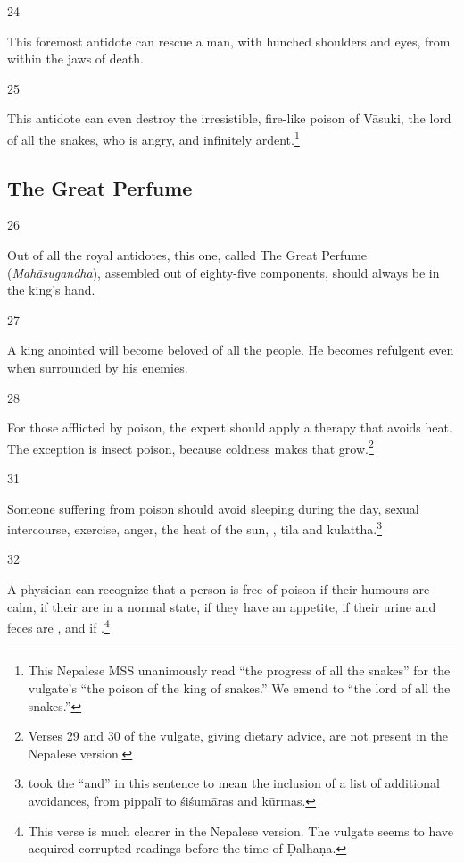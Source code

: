 \begin{translation}
\item [24]

This foremost antidote can rescue a man, with hunched shoulders and 
 eyes, from within the jaws of death.

\item [25]

This antidote can even destroy the irresistible, fire-like poison of
Vāsuki, the lord of all the snakes, who is  angry, and infinitely
ardent.\footnote{This Nepalese MSS unanimously read
     “the progress of all the snakes” for the
    vulgate's  “the poison of the king of snakes.” We
    emend to  “the lord of all the snakes.”}


\subsection{The Great Perfume}
\item [26]

Out of all the royal antidotes, this one, called The Great Perfume
(\emph{Mahāsugandha}), assembled out of eighty-five components, 
should always be in the king's hand.

\item [27]

A king anointed  will become beloved of all the people.  He 
becomes refulgent even when surrounded by his enemies. 

\item [28]

For those afflicted by poison, the expert should apply a therapy that
avoids heat.  The exception is insect poison, because coldness
makes that grow.\footnote{Verses 29 and 30 of the vulgate, giving dietary 
advice, are not present in the Nepalese version.}

\item[31]

Someone suffering from poison should avoid 
sleeping during the day, sexual intercourse, exercise, anger, the heat of the 
sun, , \gls{tila} and 
\gls{kulattha}.\footnote{ took the “and” in this 
sentence to mean the inclusion of a list of additional avoidances, from 
\gls{pippalī} to 
\glspl{śiśumāra} and \glspl{kūrma}.}


\item[32]

A physician can recognize that a person is free of poison if their 
humours are calm, if their  are in a normal state, 
if they have an appetite, if their urine and feces are , and
if .\footnote{This 
verse is much clearer in the Nepalese version.  The vulgate seems to have 
acquired corrupted readings before the time of Ḍalhaṇa.}

\end{translation}
